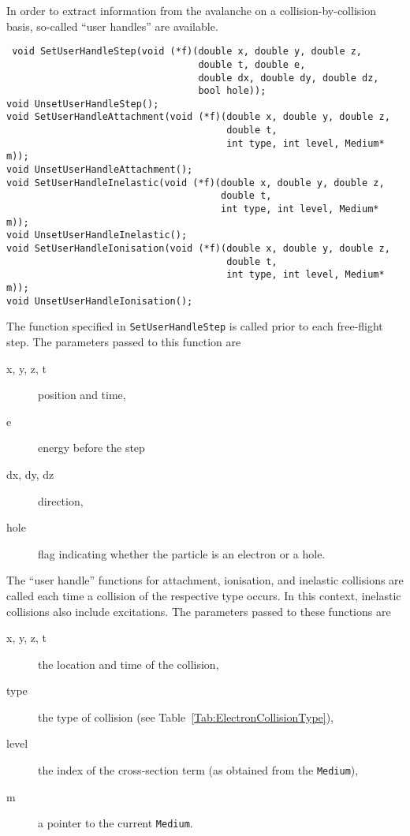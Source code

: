 In order to extract information from the avalanche on a collision-by-collision basis, 
so-called ``user handles'' are available. 
\begin{lstlisting}
 void SetUserHandleStep(void (*f)(double x, double y, double z,
                                  double t, double e,
                                  double dx, double dy, double dz,
                                  bool hole));
void UnsetUserHandleStep();
void SetUserHandleAttachment(void (*f)(double x, double y, double z,
                                       double t,
                                       int type, int level, Medium* m));
void UnsetUserHandleAttachment();
void SetUserHandleInelastic(void (*f)(double x, double y, double z,
                                      double t,
                                      int type, int level, Medium* m));
void UnsetUserHandleInelastic();
void SetUserHandleIonisation(void (*f)(double x, double y, double z,
                                       double t,
                                       int type, int level, Medium* m));
void UnsetUserHandleIonisation();
\end{lstlisting}
The function specified in \texttt{SetUserHandleStep} is called 
prior to each free-flight step. 
The parameters passed to this function are 
\begin{description}
  \item[x, y, z, t] 
  position and time, 
  \item[e]
  energy before the step
  \item[dx, dy, dz] 
  direction,
  \item[hole]
  flag indicating whether the particle is an electron or a hole.
\end{description}  
The ``user handle'' functions for attachment, ionisation, and inelastic collisions 
are called each time a collision of the respective type occurs.  
In this context, inelastic collisions also include excitations. 
The parameters passed to these functions are 
\begin{description}
  \item[x, y, z, t]
  the location and time of the collision, 
  \item[type]
  the type of collision (see Table~\ref{Tab:ElectronCollisionType}), 
  \item[level]
  the index of the cross-section term (as obtained from the \texttt{Medium}),
  \item[m]
   a pointer to the current \texttt{Medium}. 
\end{description}
